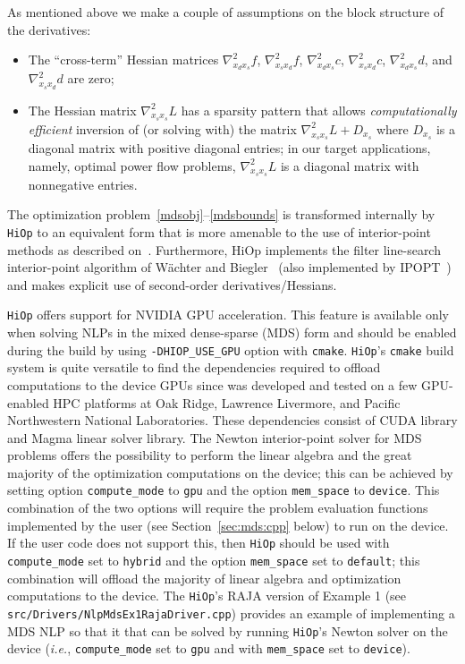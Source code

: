 \documentclass[11pt]{article}
\newcounter{line}
\newcommand{\Hi}{\texttt{HiOp}\xspace}
\begin{document}
As mentioned above we make a couple of assumptions on the block structure of the derivatives:
\begin{itemize}
    \item[A1.] The ``cross-term'' Hessian matrices $\nabla^2_{x_d x_s} f$, $\nabla^2_{x_s x_d} f$, $\nabla^2_{x_d x_s} c$, $\nabla^2_{x_s x_d} c$, $\nabla^2_{x_d x_s} d$, and $\nabla^2_{x_s x_d} d$ are zero;
    \item[A2.] The Hessian matrix $\nabla^2_{x_s x_s} L$ has a sparsity pattern that allows \textit{computationally efficient} inversion of (or solving with) the matrix $\nabla^2_{x_s x_s} L + D_{x_s}$ where $D_{x_s}$ is a diagonal matrix with positive diagonal entries; in our target applications, namely, optimal power flow problems, $\nabla^2_{x_s x_s} L$ is a diagonal matrix with nonnegative entries.
\end{itemize}

The optimization problem~\eqref{mdsobj}--\eqref{mdsbounds} is transformed internally by \Hi to an equivalent form that is more amenable to the use of interior-point methods as described on~\cite[Section~3]{petra2019memory}. Furthermore, HiOp implements the filter line-search interior-point algorithm of W{\"a}chter and Biegler~\cite{waecther_05_ipopt,waecther_05_ipopt2} (also implemented by IPOPT~\cite{waecther_05_ipopt0}) and makes explicit use of second-order derivatives/Hessians.

\Hi offers support for NVIDIA GPU acceleration. This feature is available only when solving NLPs in the mixed dense-sparse (MDS) form and should be enabled during the build by using \texttt{-DHIOP\_USE\_GPU} option with \texttt{cmake}. \Hi's \texttt{cmake} build system is quite versatile to find the dependencies required to offload computations to the device GPUs since was developed and tested on a few GPU-enabled HPC platforms at Oak Ridge, Lawrence Livermore, and Pacific Northwestern National Laboratories. These dependencies consist of CUDA library and Magma linear solver library.
The Newton interior-point solver for MDS problems offers the possibility to perform the linear algebra and the great majority of the optimization computations on the device; this can be achieved by setting option \texttt{compute\_mode} to \texttt{gpu} and the option \texttt{mem\_space} to \texttt{device}. This combination of the two options will require the problem evaluation functions implemented by the user (see Section~\ref{sec:mds:cpp} below) to run on the device. If the user code does not support this, then \Hi should be used with \texttt{compute\_mode} set to \texttt{hybrid} and the option \texttt{mem\_space} set to \texttt{default}; this combination will offload the majority of linear algebra and optimization computations to the device. The \Hi's RAJA version of Example 1 (see \texttt{src/Drivers/NlpMdsEx1RajaDriver.cpp}) provides an example of implementing a MDS NLP so that it that can be solved by running \Hi's Newton solver on the device (\textit{i.e.}, \texttt{compute\_mode} set to \texttt{gpu} and with \texttt{mem\_space} set to \texttt{device}).
\end{document}
